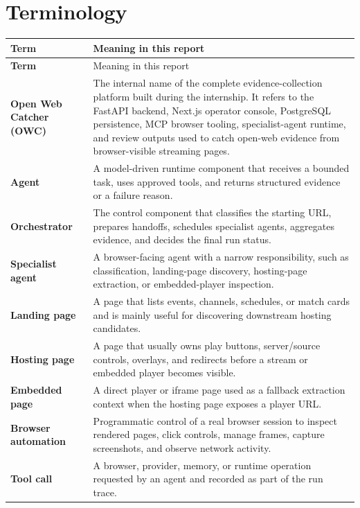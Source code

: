 \chapter*{Terminology}

\begin{longtable}{>{\raggedright\arraybackslash\bfseries}p{4.1cm}
                  >{\raggedright\arraybackslash}p{9.7cm}}
\toprule
\rowcolor{accent!8}
Term & Meaning in this report \\
\midrule
\endfirsthead
\toprule
\rowcolor{accent!8}
Term & Meaning in this report \\
\midrule
\endhead
Open Web Catcher (OWC) & The internal name of the complete evidence-collection platform built during the internship. It refers to the FastAPI backend, Next.js operator console, PostgreSQL persistence, MCP browser tooling, specialist-agent runtime, and review outputs used to catch open-web evidence from browser-visible streaming pages. \\
Agent & A model-driven runtime component that receives a bounded task, uses approved tools, and returns structured evidence or a failure reason. \\
Orchestrator & The control component that classifies the starting URL, prepares handoffs, schedules specialist agents, aggregates evidence, and decides the final run status. \\
Specialist agent & A browser-facing agent with a narrow responsibility, such as classification, landing-page discovery, hosting-page extraction, or embedded-player inspection. \\
Landing page & A page that lists events, channels, schedules, or match cards and is mainly useful for discovering downstream hosting candidates. \\
Hosting page & A page that usually owns play buttons, server/source controls, overlays, and redirects before a stream or embedded player becomes visible. \\
Embedded page & A direct player or iframe page used as a fallback extraction context when the hosting page exposes a player URL. \\
Browser automation & Programmatic control of a real browser session to inspect rendered pages, click controls, manage frames, capture screenshots, and observe network activity. \\
Tool call & A browser, provider, memory, or runtime operation requested by an agent and recorded as part of the run trace. \\

\end{longtable}

